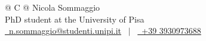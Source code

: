 \documentclass[a4paper,12pt]{article}
\begin{document}
\pagestyle{empty} 



\begin{tabularx}{\linewidth}{@{} C @{}}
\LARGE{Nicola Sommaggio} \\[7.5pt]
\centering \large{PhD student at the University of Pisa} \\
\href{n.sommaggio@studenti.unipi.it}{\raisebox{-0.05\height}\faEnvelope \ n.sommaggio@studenti.unipi.it} \ $|$ \ 
\href{tel:+39 3930973688}{\raisebox{-0.05\height}\faMobile \ +39 3930973688} \\
\end{tabularx}

\end{document}
